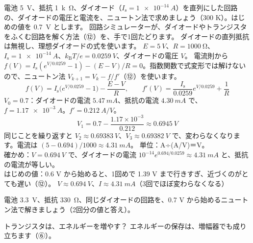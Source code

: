\label{ph:原-10:ex12}
\begin{phreidai}
電池 \qty{5}{V}、抵抗 \qty{1}{k\ohm}、ダイオード（$I_{\mathrm s}=\qty{1e-14}{A}$）を直列にした回路の、ダイオードの電圧と電流を、ニュートン法で求めましょう（300 K）。はじめの値を \qty{0.7}{V} とします。
\phbamen
回路シミュレーターが、ダイオードやトランジスタをふくむ回路を解く方法（⑫）を、手で1回たどります。
\phmushi
ダイオードの直列抵抗は無視し、理想ダイオードの式を使います。
\phzu
$E=\qty{5}{V}$、$R=\qty{1000}{\ohm}$、$I_{\mathrm s}=\qty{1e-14}{A}$、$k_{\mathrm B}T/e=\qty{0.0259}{V}$、ダイオードの電圧 $V$。
\phriyu
電流則から $f(V)=I_{\mathrm s}(e^{V/0.0259}-1)-(E-V)/R=0$。指数関数で式変形では解けないので、ニュートン法 $V_{k+1}=V_k-f/f'$（⑫）を使います。
\phtateru
\[ f(V)=I_{\mathrm s}\bigl(e^{V/0.0259}-1\bigr)-\frac{E-V}{R},\qquad f'(V)=\frac{I_{\mathrm s}}{0.0259}e^{V/0.0259}+\frac1R \]
\phtoku
$V_0=0.7$：ダイオードの電流 $\qty{5.47}{mA}$、抵抗の電流 $\qty{4.30}{mA}$ で、$f=\qty{1.17e-3}{A}$。$f'=\qty{0.212}{A/V}$。
\[ V_1=0.7-\frac{1.17\times10^{-3}}{0.212}\approx\qty{0.6945}{V} \]
同じことを繰り返すと $V_2\approx\qty{0.69383}{V}$、$V_3\approx\qty{0.69382}{V}$ で、変わらなくなります。電流は $(5-0.694)/1000\approx\qty{4.31}{mA}$。
\phtashikame
単位：A÷(A/V)＝V。\\
確かめ：$V=\qty{0.694}{V}$ で、ダイオードの電流 $10^{-14}e^{0.694/0.0259}\approx\qty{4.31}{mA}$ と、抵抗の電流が等しい。\\
はじめの値：0.6 V から始めると、1回めで 1.39 V まで行きすぎ、近づくのがとても遅い（⑫）。
\kotae $V\approx\qty{0.694}{V}$、$I\approx\qty{4.31}{mA}$（3回でほぼ変わらなくなる）
\end{phreidai}
\begin{jibun}
電池 \qty{3.3}{V}、抵抗 \qty{330}{\ohm}、同じダイオードの回路を、0.7 V から始めるニュートン法で解きましょう（2回分の値と答え）。
\end{jibun}

\begin{tsumazuki}{トランジスタは、エネルギーを増やす？}
エネルギーの保存は、増幅器でも成り立ちます（⑥）。
\end{tsumazuki}

